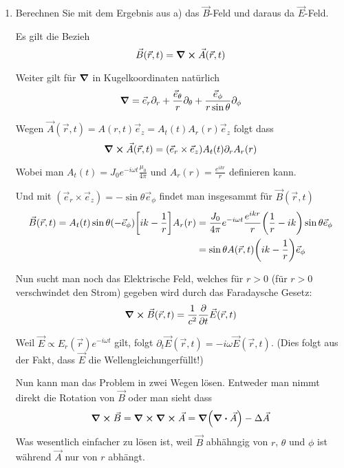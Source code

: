 \begin{enumerate}[label=\alph*)]
  \item Berechnen Sie mit dem Ergebnis aus a) das $\vec B$-Feld und
    daraus da $\vec E$-Feld.

    Es gilt die Bezieh
    \begin{equation}
      \vec B(\vec r, t)= \curl \vec A(\vec r, t)
    \end{equation}

    Weiter gilt für $\grad$ in Kugelkoordinaten natürlich
    \begin{equation*}
      \grad = \vec e_r \partial_r + \frac{\vec e_\theta}{r}\partial_\theta 
      + \frac{\vec e_\phi}{r\sin\theta}\partial_\phi
    \end{equation*}
    
    Wegen $\vec A(\vec r, t)=A(r, t)\vec e_z = A_t(t)A_r(r)\vec e_z$ folgt
    dass
    \begin{equation}
      \curl \vec A(\vec r, t) 
      =(\vec e_r \times \vec e_z) A_t(t)\partial_r A_r(r)
    \end{equation}

    Wobei man $A_t(t)=J_0 e^{-i\omega t}\frac{\mu_0}{4\pi}$ und
    $A_r(r)=\frac{e^{ikr}}{r}$ definieren kann.

    Und mit $(\vec e_r\times\vec e_z)=-\sin\theta \vec e_\phi$ findet man 
    insgesammt für $\vec B(\vec r, t)$
    \begin{equation}
      \begin{split}
        \vec B(\vec r, t)=A_t(t)\sin\theta(-\vec e_\phi)
        \qty[ik-\frac{1}{r}]A_r(r)
        &= \frac{J_0}{4\pi}e^{-i\omega t}\frac{e^{ikr}}{r} 
        \qty(\frac{1}{r} -ik)\sin\theta\vec e_\phi\\
        &= \sin\theta A(\vec r, t) \qty(ik- \frac{1}{r})\vec e_\phi 
      \end{split}
    \end{equation}
    
    Nun sucht man noch das Elektrische Feld, welches für $r>0$ 
    (für $r>0$ verschwindet den Strom) gegeben wird
    durch das Faradaysche Gesetz:
    \begin{equation}
      \curl \vec B(\vec r, t)= \frac{1}{c^2} \pdv t \vec E(\vec r, t) 
    \end{equation}
    
    Weil $\vec E\propto E_r(\vec r) e^{-i\omega t}$ gilt, folgt 
    $\partial_t \vec E(\vec r, t)=-i\omega \vec E(\vec r, t)$. (Dies
    folgt aus der Fakt, dass $\vec E$ die Wellengleichungerfüllt!)

    Nun kann man das Problem in zwei Wegen lösen. Entweder man nimmt direkt
    die Rotation von $\vec B$ oder man sieht dass
    \begin{equation}
      \curl\vec B=\curl\curl\vec A=\grad(\div\vec A)-\Delta \vec A
    \end{equation}
    Was wesentlich einfacher zu lösen ist, weil $\vec B$ abhähngig von
    $r$, $\theta$ und $\phi$ ist während $\vec A$ nur von $r$ abhängt.


\end{enumerate}
